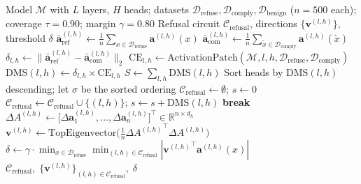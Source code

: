 \documentclass[11pt]{article}
\begin{document}
\begin{algorithm}[t]
\caption{Phase 1: DMS Circuit Identification}
\label{alg:dms}
\begin{algorithmic}[1]
\Require Model $\mathcal{M}$ with $L$ layers, $H$ heads; datasets $\mathcal{D}_{\mathrm{refuse}},\mathcal{D}_{\mathrm{comply}},\mathcal{D}_{\mathrm{benign}}$ ($n{=}500$ each); coverage $\tau{=}0.90$; margin $\gamma{=}0.80$
\Ensure Refusal circuit $\mathcal{C}_{\mathrm{refusal}}$, directions $\{\mathbf{v}^{(l,h)}\}$, threshold $\delta$
\Statex
{}
    \State $\bar{\mathbf{a}}_{\mathrm{ref}}^{(l,h)} \gets \frac{1}{n}\sum_{x\in\mathcal{D}_{\mathrm{refuse}}}\mathbf{a}^{(l,h)}(x)$
    \State $\bar{\mathbf{a}}_{\mathrm{com}}^{(l,h)} \gets \frac{1}{n}\sum_{\tilde{x}\in\mathcal{D}_{\mathrm{comply}}}\mathbf{a}^{(l,h)}(\tilde{x})$
    \State $\delta_{l,h} \gets \|\bar{\mathbf{a}}_{\mathrm{ref}}^{(l,h)} - \bar{\mathbf{a}}_{\mathrm{com}}^{(l,h)}\|_2$ 
    \State $\mathrm{CE}_{l,h} \gets \text{ActivationPatch}(\mathcal{M}, l, h, \mathcal{D}_{\mathrm{refuse}}, \mathcal{D}_{\mathrm{comply}})$ 
    \State $\mathrm{DMS}(l,h) \gets \delta_{l,h}\times\mathrm{CE}_{l,h}$
\EndFor
\Statex
\State $S \gets \sum_{l,h}\mathrm{DMS}(l,h)$
\State Sort heads by $\mathrm{DMS}(l,h)$ descending; let $\sigma$ be the sorted ordering
\State $\mathcal{C}_{\mathrm{refusal}}\gets\emptyset$;\; $s\gets 0$
    \State $\mathcal{C}_{\mathrm{refusal}} \gets \mathcal{C}_{\mathrm{refusal}}\cup\{(l,h)\}$;\; $s\gets s + \mathrm{DMS}(l,h)$
     \textbf{break} \EndIf
\EndFor
\Statex
{}
    \State $\Delta A^{(l,h)} \gets \big[\Delta\mathbf{a}_1^{(l,h)},\ldots,\Delta\mathbf{a}_n^{(l,h)}\big]^\top\in\mathbb{R}^{n\times d_h}$ 
    \State $\mathbf{v}^{(l,h)}\gets\text{TopEigenvector}\!\big(\tfrac{1}{n}{\Delta A^{(l,h)}}^\top\!\Delta A^{(l,h)}\big)$ 
\EndFor
\Statex
\State $\delta \gets \gamma\cdot\min_{x\in\mathcal{D}_{\mathrm{refuse}}}\min_{(l,h)\in\mathcal{C}_{\mathrm{refusal}}}|{\mathbf{v}^{(l,h)}}^\top\!\mathbf{a}^{(l,h)}(x)|$ 
\State \Return $\mathcal{C}_{\mathrm{refusal}},\;\{\mathbf{v}^{(l,h)}\}_{(l,h)\in\mathcal{C}_{\mathrm{refusal}}},\;\delta$
\end{algorithmic}
\end{algorithm}
\end{document}
